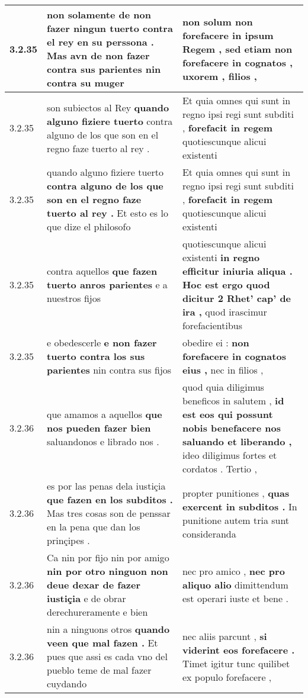 \begin{tabular}{|p{1cm}|p{6.5cm}|p{6.5cm}|}
3.2.35 & non solamente de non fazer ningun tuerto contra el rey en su perssona . \textbf{ Mas avn de non fazer contra sus parientes } nin contra su muger & non solum non forefacere in ipsum Regem , \textbf{ sed etiam non forefacere in cognatos , } uxorem , filios , \\\hline
3.2.35 & son subiectos al Rey \textbf{ quando alguno fiziere tuerto } contra alguno de los que son en el regno faze tuerto al rey . & Et quia omnes qui sunt in regno ipsi regi sunt subditi , \textbf{ forefacit in regem } quotiescunque alicui existenti \\\hline
3.2.35 & quando alguno fiziere tuerto \textbf{ contra alguno de los que son en el regno faze tuerto al rey . } Et esto es lo que dize el philosofo & Et quia omnes qui sunt in regno ipsi regi sunt subditi , \textbf{ forefacit in regem } quotiescunque alicui existenti \\\hline
3.2.35 & contra aquellos \textbf{ que fazen tuerto anros parientes } e a nuestros fijos & quotiescunque alicui existenti \textbf{ in regno efficitur iniuria aliqua . Hoc est ergo quod dicitur 2 Rhet’ cap’ de ira , } quod irascimur forefacientibus \\\hline
3.2.35 & e obedescerle \textbf{ e non fazer tuerto contra los sus parientes } nin contra sus fijos & obedire ei : \textbf{ non forefacere in cognatos eius , } nec in filios , \\\hline
3.2.36 & que amamos a aquellos \textbf{ que nos pueden fazer bien } saluandonos e librado nos . & quod quia diligimus beneficos in salutem , \textbf{ id est eos qui possunt nobis benefacere nos saluando et liberando , } ideo diligimus fortes et cordatos . Tertio , \\\hline
3.2.36 & es por las penas dela iustiçia \textbf{ que fazen en los subditos . } Mas tres cosas son de penssar en la pena que dan los prinçipes . & propter punitiones , \textbf{ quas exercent in subditos . } In punitione autem tria sunt consideranda \\\hline
3.2.36 & Ca nin por fijo nin por amigo \textbf{ nin por otro ninguon non deue dexar de fazer iustiçia } e de obrar derechureramente e bien & nec pro amico , \textbf{ nec pro aliquo alio } dimittendum est operari iuste et bene . \\\hline
3.2.36 & nin a ninguons otros \textbf{ quando veen que mal fazen . } Et pues que assi es cada vno del pueblo teme de mal fazer cuydando & nec aliis parcunt , \textbf{ si viderint eos forefacere . } Timet igitur tunc quilibet ex populo forefacere , \\\hline

\end{tabular}
